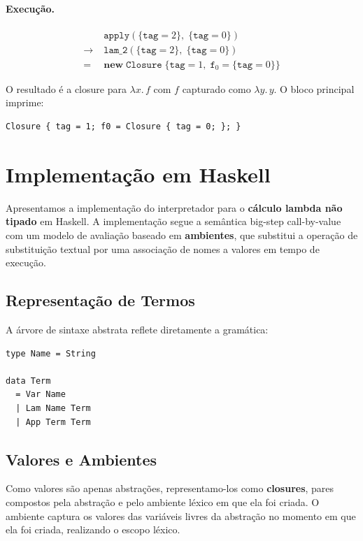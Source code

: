 \paragraph{Execução.}

\begin{align*}
  &\mathtt{apply}(\{\mathtt{tag}=2\},\;\{\mathtt{tag}=0\})
  \\
  \to\;&\mathtt{lam\_2}(\{\mathtt{tag}=2\},\;\{\mathtt{tag}=0\})
  \\
  =\;&\mathbf{new}\;\mathtt{Closure}\;\{\mathtt{tag}=1,\;
  \mathtt{f}_0=\{\mathtt{tag}=0\}\}
\end{align*}

O resultado é a closure para \(\lambda x.\, f\) com \(f\) capturado
como \(\lambda y.\, y\). O bloco principal imprime:
\begin{verbatim}
Closure { tag = 1; f0 = Closure { tag = 0; }; }
\end{verbatim}

\section{Implementação em Haskell}

Apresentamos a implementação do interpretador para o \textbf{cálculo
lambda não tipado} em Haskell. A implementação segue a semântica
big-step call-by-value com um modelo de avaliação baseado em
\textbf{ambientes}, que substitui a operação de substituição textual
por uma associação de nomes a valores em tempo de execução.

\subsection{Representação de Termos}

A árvore de sintaxe abstrata reflete diretamente a gramática:

\begin{verbatim}
type Name = String

data Term
  = Var Name
  | Lam Name Term
  | App Term Term
\end{verbatim}

\subsection{Valores e Ambientes}

Como valores são apenas abstrações, representamo-los como
\textbf{closures}, pares compostos pela abstração e pelo ambiente
léxico em que ela foi criada. O ambiente captura os valores das
variáveis livres da abstração no momento em que ela foi criada,
realizando o escopo léxico.

